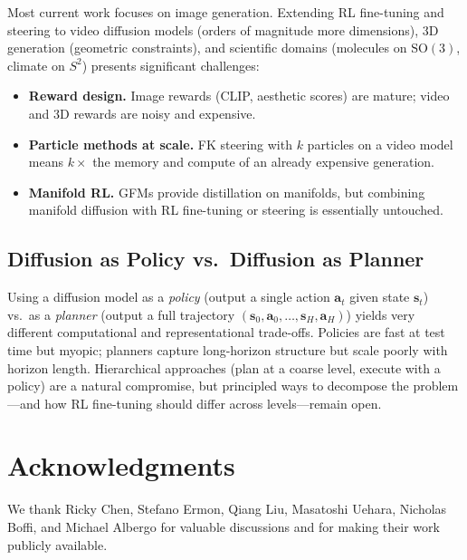 \documentclass[11pt]{article}
\begin{document}
Most current work focuses on image generation.
Extending RL fine-tuning and steering to video diffusion models (orders of magnitude more dimensions), 3D generation (geometric constraints), and scientific domains (molecules on $\mathrm{SO}(3)$, climate on $S^2$) presents significant challenges:
\begin{itemize}
    \item \textbf{Reward design.} Image rewards (CLIP, aesthetic scores) are mature; video and 3D rewards are noisy and expensive.
    \item \textbf{Particle methods at scale.} FK steering with $k$ particles on a video model means $k\times$ the memory and compute of an already expensive generation.
    \item \textbf{Manifold RL.} GFMs \citep{davis2025gfm} provide distillation on manifolds, but combining manifold diffusion with RL fine-tuning or steering is essentially untouched.
\end{itemize}

\subsection{Diffusion as Policy vs.\ Diffusion as Planner}

Using a diffusion model as a \emph{policy} (output a single action $\mathbf{a}_t$ given state $\mathbf{s}_t$) vs.\ as a \emph{planner} (output a full trajectory $(\mathbf{s}_0, \mathbf{a}_0, \ldots, \mathbf{s}_H, \mathbf{a}_H)$) yields very different computational and representational trade-offs.
Policies are fast at test time but myopic; planners capture long-horizon structure but scale poorly with horizon length.
Hierarchical approaches (plan at a coarse level, execute with a policy) are a natural compromise, but principled ways to decompose the problem---and how RL fine-tuning should differ across levels---remain open.

\section*{Acknowledgments}

We thank Ricky Chen, Stefano Ermon, Qiang Liu, Masatoshi Uehara, Nicholas Boffi, and Michael Albergo for valuable discussions and for making their work publicly available.
\end{document}

